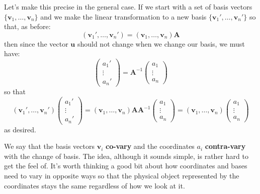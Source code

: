 	Let's make this precise in the general case. If we start with a set of basis vectors $\{\mathbf v_1, \dots, \mathbf v_n\}$ and we make the linear transformation to a new basis $\{\mathbf v_1', \dots, \mathbf v_n' \}$ so that, as before:
	\begin{equation}\label{eq:CovariantTransform2}
		(\mathbf v_1', \dots, \mathbf v_n') = (\mathbf v_1, \dots, \mathbf v_n ) \mathbf A
	\end{equation}
	then since the vector $\mathbf u$ should not change when we change our basis, we must have: 
	\begin{equation}\label{eq:ContravariantTransform2}
		\begin{pmatrix}
			a_1' \\ \vdots \\ a_n'
		\end{pmatrix}
		= 
		\mathbf{A}^{-1}
		\begin{pmatrix}
			a_1 \\ \vdots \\ a_n
		\end{pmatrix}
	\end{equation}
	so that 
	\begin{equation*}
		(\mathbf v_1', \dots, \mathbf v_n') 
		\begin{pmatrix}
			a_1' \\ \vdots \\ a_n'
		\end{pmatrix} 
		= (\mathbf v_1, \dots, \mathbf v_n ) \mathbf A \mathbf A^{-1} 
		\begin{pmatrix}
			a_1 \\ \vdots \\ a_n
		\end{pmatrix}
		= (\mathbf v_1, \dots, \mathbf v_n ) 
		\begin{pmatrix}
			a_1 \\ \vdots \\ a_n
		\end{pmatrix}
	\end{equation*}
	as desired. 
	
	We say that the basis vectors $\mathbf v_i$ \textbf{co-vary} and the coordinates $a_i$ \textbf{contra-vary} with the change of basis. The idea, although it sounds simple, is rather hard to get the feel of. It's worth thinking a good bit about how coordinates and bases need to vary in opposite ways so that the physical object represented by the coordinates stays the same regardless of how we look at it. 
	
